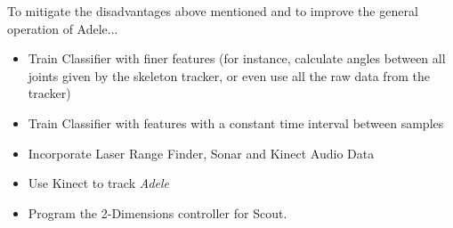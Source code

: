 \color{red}To mitigate the disadvantages above mentioned and to improve the general operation of Adele...
\color{black}
\begin{itemize}
\item Train Classifier with finer features (for instance, calculate angles between all joints given by the skeleton tracker, or even use all the raw data from the tracker)
\item Train Classifier with features with a constant time interval between samples
\item Incorporate Laser Range Finder, Sonar and Kinect Audio Data
\item Use Kinect to track \textit{Adele}
\item Program the 2-Dimensions controller for Scout.
\end{itemize}